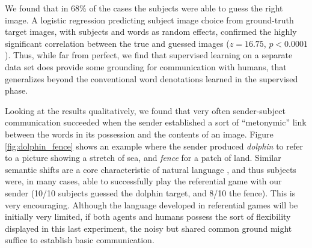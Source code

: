We found that in 68\% of the cases the subjects were able to guess the
right image. A logistic regression predicting subject image choice from
ground-truth target images, with subjects and words as random effects, confirmed the highly significant correlation between the
true and guessed images ($z=16.75$, $p<0.0001$). Thus, while far from perfect, we find that supervised learning on a separate data set does provide some grounding for communication with humans, that generalizes beyond the conventional word denotations learned in the supervised phase. 

Looking at the results qualitatively, we found that very often sender-subject
communication succeeded when the sender established a sort of
``metonymic'' link between the words in its possession and the
contents of an image. Figure \ref{fig:dolphin_fence} shows an example where the sender produced \emph{dolphin} to refer to a picture showing a stretch of sea, and \emph{fence} for a patch of land.  Similar semantic shifts are a core
characteristic of natural language \citep[e.g.,][]{Pustejovsky:1995},
and thus subjects were, in many cases, able to successfully play the
referential game with our sender (10/10 subjects guessed the dolphin
target, and 8/10 the fence). This is very encouraging. Although the language developed in referential games will  be initially very
limited, if both
agents and humans possess the sort of flexibility displayed in this
last experiment, the
noisy but shared common ground might suffice to establish basic
communication.